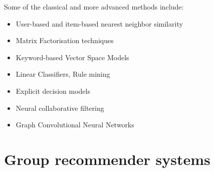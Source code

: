 Some of the classical and more advanced methods include:
\begin{itemize}
    \item User-based and item-based nearest neighbor similarity \cite{hill1995recommending}\cite{shardanand1995social}\cite{balabanovic1997fab}
    \item Matrix Factorisation techniques\cite{koren2009matrix}
    \item Keyword-based Vector Space Models
    \item Linear Classifiers, Rule mining 
    \item Explicit decision models 
    \item Neural collaborative filtering
    \item Graph Convolutional Neural Networks
\end{itemize}

\section{Group recommender systems} \label{section01.1}